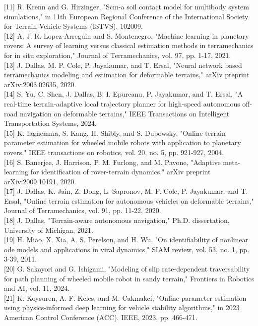 \documentclass[10pt]{article}
\begin{document}
[11] R. Krenn and G. Hirzinger, "Scm-a soil contact model for multibody system simulations," in 11th European Regional Conference of the International Society for Terrain-Vehicle Systems (ISTVS), 102009.\\[0pt]
[12] A. J. R. Lopez-Arreguin and S. Montenegro, "Machine learning in planetary rovers: A survey of learning versus classical estimation methods in terramechanics for in situ exploration," Journal of Terramechanics, vol. 97, pp. 1-17, 2021.\\[0pt]
[13] J. Dallas, M. P. Cole, P. Jayakumar, and T. Ersal, "Neural network based terramechanics modeling and estimation for deformable terrains," arXiv preprint arXiv:2003.02635, 2020.\\[0pt]
[14] S. Yu, C. Shen, J. Dallas, B. I. Epureanu, P. Jayakumar, and T. Ersal, "A real-time terrain-adaptive local trajectory planner for high-speed autonomous off-road navigation on deformable terrains," IEEE Transactions on Intelligent Transportation Systems, 2024.\\[0pt]
[15] K. Iagnemma, S. Kang, H. Shibly, and S. Dubowsky, "Online terrain parameter estimation for wheeled mobile robots with application to planetary rovers," IEEE transactions on robotics, vol. 20, no. 5, pp. 921-927, 2004.\\[0pt]
[16] S. Banerjee, J. Harrison, P. M. Furlong, and M. Pavone, "Adaptive meta-learning for identification of rover-terrain dynamics," arXiv preprint arXiv:2009.10191, 2020.\\[0pt]
[17] J. Dallas, K. Jain, Z. Dong, L. Sapronov, M. P. Cole, P. Jayakumar, and T. Ersal, "Online terrain estimation for autonomous vehicles on deformable terrains," Journal of Terramechanics, vol. 91, pp. 11-22, 2020.\\[0pt]
[18] J. Dallas, "Terrain-aware autonomous navigation," Ph.D. dissertation, University of Michigan, 2021.\\[0pt]
[19] H. Miao, X. Xia, A. S. Perelson, and H. Wu, "On identifiability of nonlinear ode models and applications in viral dynamics," SIAM review, vol. 53, no. 1, pp. 3-39, 2011.\\[0pt]
[20] G. Sakayori and G. Ishigami, "Modeling of slip rate-dependent traversability for path planning of wheeled mobile robot in sandy terrain," Frontiers in Robotics and AI, vol. 11, 2024.\\[0pt]
[21] K. Koysuren, A. F. Keles, and M. Cakmakci, "Online parameter estimation using physics-informed deep learning for vehicle stability algorithms," in 2023 American Control Conference (ACC). IEEE, 2023, pp. 466-471.\\[0pt]
\end{document}
